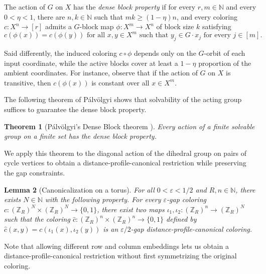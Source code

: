 \documentclass[10pt,a4paper]{amsart}
\newtheorem{theorem}{Theorem}
\newtheorem{lemma}[theorem]{Lemma}
\begin{document}
The action of $G$ on $X$ has the \emph{dense block property} if for every $r, m \in \mathbb{N}$ and every $0 < \eta < 1$, there are $n, k \in \mathbb{N}$ such that $mk \geq (1 - \eta)n$, and every coloring $c : X^n \to [r]$ admits a $G$-block map $\phi : X^m \to X^n$ of block size $k$ satisfying \[c(\phi(x)) = c(\phi(y)) \text{ for all $x, y \in X^m$ such that $y_j \in G \cdot x_j$ for every $j \in [m]$.}\]

Said differently, the induced coloring $c\circ\phi$ depends only on the $G$-orbit of each input coordinate, while the active blocks cover at least a $1-\eta$ proportion of the ambient coordinates.
For instance, observe that if the action of $G$ on $X$ is transitive, then $c(\phi(x))$ is constant over all $x \in X^m$.

The following theorem of Pálvölgyi shows that solvability of the acting group suffices to guarantee the dense block property.


\begin{theorem}[Pálvölgyi’s Dense Block theorem {\cite[Theorem 11]{Palvolgyi26}}]\label{lem:palvolgyi}
    Every action of a finite solvable group on a finite set has the dense block property.
\end{theorem}


We apply this theorem to the diagonal action of the dihedral group on pairs of cycle vertices to obtain a distance-profile-canonical restriction while preserving the gap constraints.

\begin{lemma}[Canonicalization on a torus]\label{lem:make-nice}
    For all $0 < \varepsilon < 1/2$ and $R, n \in \mathbb{N}$, there exists $N \in \mathbb{N}$ with the following property.
    For every $\varepsilon$-gap coloring $c : (\mathbb{Z}_R)^N \times (\mathbb{Z}_R)^N \to \{0, 1\}$, there exist two maps $\iota_1, \iota_2 : (\mathbb{Z}_R)^n \to (\mathbb{Z}_R)^N$ such that the coloring $\widehat{c} : (\mathbb{Z}_{R})^n \times (\mathbb{Z}_{R})^n \to \{0, 1\}$ defined by $\widehat{c}(x, y) = c(\iota_1(x), \iota_2(y))$ is an $\varepsilon/2$-gap distance-profile-canonical coloring.  
\end{lemma}

Note that allowing different row and column embeddings lets us obtain a distance-profile-canonical restriction without first symmetrizing the original coloring.
\end{document}

